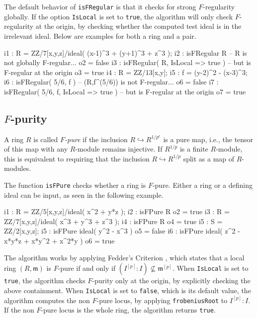 \documentclass{amsart}
\begin{document}
The default behavior of \texttt{isFRegular} is that it checks for strong $F$-regularity
globally. If the option \texttt{IsLocal} is set to \texttt{true}, the algorithm will only
check $F$-regularity at the origin, by checking whether the computed test ideal is in the irrelevant ideal.
Below are examples for both a ring and a pair.


\medskip
{\small
\begin{MyVerbatim}
i1 : R = ZZ/7[x,y,z]/ideal( (x-1)^3 + (y+1)^3 + z^3 );
i2 : isFRegular R -- R is not globally F-regular...
o2 = false
i3 : isFRegular( R, IsLocal => true ) -- but is F-regular at the origin
o3 = true
i4 : R = ZZ/13[x,y];
i5 : f = (y-2)^2 - (x-3)^3;
i6 : isFRegular( 5/6, f ) -- (R,f^(5/6)) is not F-regular...
o6 = false
i7 : isFRegular( 5/6, f, IsLocal => true ) -- but is F-regular at the origin
o7 = true
\end{MyVerbatim}
}\medskip

\subsection{$F$-purity}
\begin{definition}
A ring $R$ is called \emph{$F$-pure} if
the inclusion $R \hookrightarrow R^{1/p^{e}}$ is a pure map, i.e.,
the tensor of this map with any $R$-module remains injective.  If $R^{1/p}$ is a finite $R$-module, this is equivalent to requiring that the inclusion $R \hookrightarrow R^{1/p}$ split as a map of $R$-modules.
\end{definition}

The function \texttt{isFPure} checks whether a ring is $F$-pure.
Either a ring or a defining ideal can be input, as seen in the following example.


\medskip
{\small
\begin{MyVerbatim}
i1 : R = ZZ/5[x,y,z]/ideal( x^2 + y*z );
i2 : isFPure R
o2 = true
i3 : R = ZZ/7[x,y,z]/ideal( x^3 + y^3 + z^3 );
i4 : isFPure R
o4 = true
i5 : S = ZZ/2[x,y,z];
i5 : isFPure ideal( y^2 - x^3 )
o5 = false
i6 : isFPure ideal( z^2 - x*y*z + x*y^2 + x^2*y )
o6 = true
\end{MyVerbatim}
}\medskip


The algorithm works by applying Fedder's Criterion {\cite{FedderFPureRat}}, which states that a
local ring $(R, \mathfrak{m})$ is $F$-pure if and only if $(I^{[p]} : I)
\not\subseteq \mathfrak{m}^{[p]}$. 
When \texttt{IsLocal} is set to \texttt{true}, the algorithm checks $F$-purity only at the origin, by explicitly checking the above
containment. When \texttt{IsLocal} is set to \texttt{false}, which is its default value, the
algorithm computes the non $F$-pure locus, by applying \texttt{frobeniusRoot}
to $I^{[p]} :I$. If the non $F$-pure locus is the whole ring, the algorithm
returns \texttt{true}.
\end{document}
